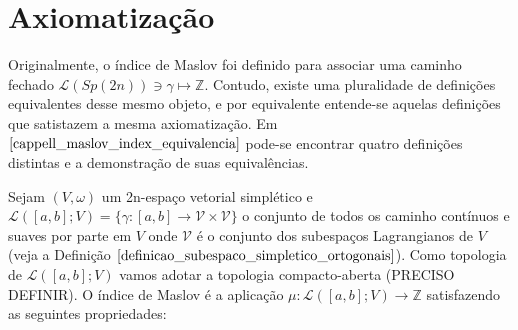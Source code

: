 \documentclass[12pt]{book}
\newcommand{\caminhos}[3]{\mathcal{L}([#1, #2]; #3)}
\newcommand{\caminhossempontobase}[1]{\mathcal{L}(#1)}
\newcommand{\gruposimpletico}[1]{Sp(#1)}
\newcommand{\inteiros}{\mathbb{Z}}
\newcommand{\vermelho}[1]{{\color{red}#1}}
\begin{document}
	\section{Axiomatização}
	
	Originalmente, o índice de Maslov foi definido para associar uma caminho fechado $\caminhossempontobase{\gruposimpletico{2n}} \ni \gamma \mapsto \inteiros$. Contudo, existe uma pluralidade de definições equivalentes desse mesmo objeto, e por equivalente entende-se aquelas definições que satistazem a mesma axiomatização. Em $\cite{cappell_maslov_index_equivalencia}$ pode-se encontrar quatro definições distintas e a demonstração de suas equivalências.
	
	Sejam $(V, \omega)$ um 2n-espaço vetorial simplético e $\caminhos{a}{b}{V}= \{\gamma:[a,b]\to \mathcal{V} \times \mathcal{V} \}$ o conjunto de todos os caminho contínuos e suaves por parte em $V$ onde $\mathcal{V}$ é o conjunto dos subespaços Lagrangianos de $V$ (veja a Definição $\ref{definicao_subespaco_simpletico_ortogonais}$). Como topologia de $\caminhos{a}{b}{V}$ vamos \vermelho{adotar a topologia compacto-aberta (PRECISO DEFINIR).} O índice de Maslov é a aplicação $\mu:\caminhos{a}{b}{V}\to \inteiros$ satisfazendo as seguintes propriedades:
\end{document}

